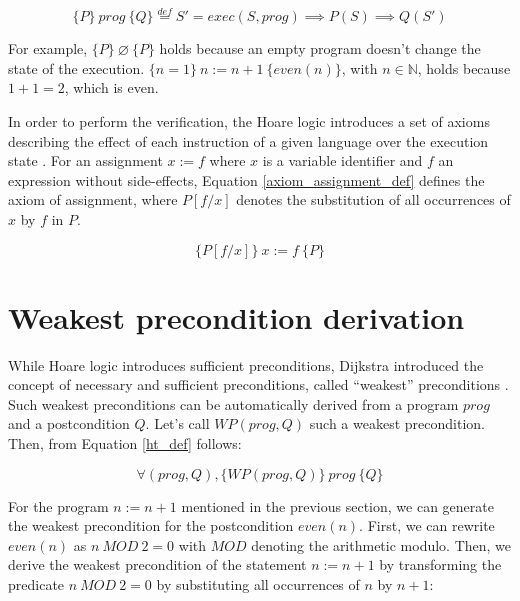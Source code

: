 \documentclass{kththesis}
\newcommand{\htriple}[3]{\ensuremath{\{#1\}~#2~\{#3\}}}
\newcommand{\WP}{\ensuremath{\mathit{WP}}}
\newcommand{\eqdef}{\stackrel{def}{=}}
\begin{document}
{\begin{equation}
  \htriple{P}{prog}{Q} \eqdef S' = exec(S, prog) \implies P(S) \implies Q(S')
  \label{ht_def}
\end{equation}

For example, \htriple{P}{\varnothing}{P} holds because an empty program doesn't change the state of the execution. \htriple{n=1}{n:=n+1}{even(n)}, with $n \in \mathbb{N}$, holds because $1+1=2$, which is even.

In order to perform the verification, the Hoare logic introduces a set of axioms describing the effect of each instruction of a given language over the execution state \cite{hoare_axiomatic_1969}. For an assignment $x:=f$ where $x$ is a variable identifier and $f$ an expression without side-effects, Equation \ref{axiom_assignment_def} defines the axiom of assignment, where $P[f/x]$ denotes the substitution of all occurrences of $x$ by $f$ in $P$.

\begin{equation}
  \htriple{P[f/x]}{x:=f}{P}
  \label{axiom_assignment_def}
\end{equation}


\section{Weakest precondition derivation}

While Hoare logic introduces sufficient preconditions, Dijkstra introduced the concept of necessary and sufficient preconditions, called ``weakest'' preconditions \cite{dijkstra_guarded_1975}. Such weakest preconditions can be automatically derived from a program $prog$ and a postcondition $Q$. Let's call $\WP(prog, Q)$ such a weakest precondition. Then, from Equation \ref{ht_def} follows:

\begin{equation}
  \forall (prog, Q),
  \htriple{\WP(prog,Q)}{prog}{Q}
  \label{ht_wp_eq}
\end{equation}

For the program $n:=n+1$ mentioned in the previous section, we can generate the weakest precondition for the postcondition $even(n)$. First, we can rewrite $even(n)$ as $n~MOD~2 = 0$ with $MOD$ denoting the arithmetic modulo. Then, we derive the weakest precondition of the statement $n:=n+1$ by transforming the predicate $n~MOD~2 = 0$ by substituting all occurrences of $n$ by $n+1$:

}
\end{document}
